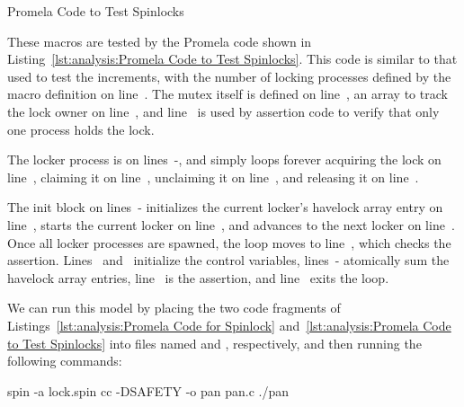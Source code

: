\begin{listing}[tb]

\caption{Promela Code to Test Spinlocks}
\label{lst:analysis:Promela Code to Test Spinlocks}
\end{listing}

\begin{lineref}
These macros are tested by the Promela code shown in
Listing~\ref{lst:analysis:Promela Code to Test Spinlocks}.
This code is similar to that used to test the increments,
with the number of locking processes defined by the 
macro definition on line~.
The mutex itself is defined on line~,
an array to track the lock owner
on line~, and line~ is used by assertion
code to verify that only one process holds the lock.
\end{lineref}

\begin{lineref}
The locker process is on lines~-, and simply loops forever
acquiring the lock on line~, claiming it on line~,
unclaiming it on line~, and releasing it on line~.
\end{lineref}

\begin{lineref}
The init block on lines~- initializes the current locker's
havelock array entry on line~, starts the current locker on
line~, and advances to the next locker on line~.
Once all locker processes are spawned, the  loop
moves to line~, which checks the assertion.
Lines~ and~ initialize the control variables,
lines~- atomically sum the havelock array entries,
line~ is the assertion, and line~ exits the loop.
\end{lineref}

We can run this model by placing the two code fragments of
Listings~\ref{lst:analysis:Promela Code for Spinlock}
and~\ref{lst:analysis:Promela Code to Test Spinlocks} into
files named  and , respectively, and then running
the following commands:

\begin{VerbatimU}
spin -a lock.spin
cc -DSAFETY -o pan pan.c
./pan
\end{VerbatimU}

